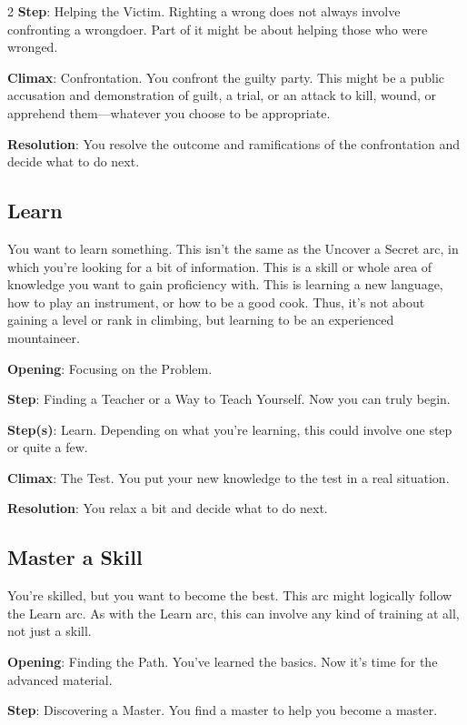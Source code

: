\begin{multicols}{2}
\textbf{Step}: Helping the Victim. Righting a wrong does not always involve confronting a wrongdoer. Part of it might be about helping those who were wronged.

\textbf{Climax}: Confrontation. You confront the guilty party. This might be a public accusation and demonstration of guilt, a trial, or an attack to kill, wound, or apprehend them—whatever you choose to be appropriate. 

\textbf{Resolution}: You resolve the outcome and ramifications of the confrontation and decide what to do next.

\subsection{Learn}

You want to learn something. This isn’t the same as the Uncover a Secret arc, in which you’re looking for a bit of information. This is a skill or whole area of knowledge you want to gain proficiency with. This is learning a new language, how to play an instrument, or how to be a good cook. Thus, it’s not about gaining a level or rank in climbing, but learning to be an experienced mountaineer.

\textbf{Opening}: Focusing on the Problem. 

\textbf{Step}: Finding a Teacher or a Way to Teach Yourself. Now you can truly begin.

\textbf{Step(s)}: Learn. Depending on what you’re learning, this could involve one step or quite a few.

\textbf{Climax}: The Test. You put your new knowledge to the test in a real situation.

\textbf{Resolution}: You relax a bit and decide what to do next.

\subsection{Master a Skill}

You’re skilled, but you want to become the best. This arc might logically follow the Learn arc. As with the Learn arc, this can involve any kind of training at all, not just a skill. 

\textbf{Opening}: Finding the Path. You’ve learned the basics. Now it’s time for the advanced material.

\textbf{Step}: Discovering a Master. You find a master to help you become a master.


\end{multicols}
